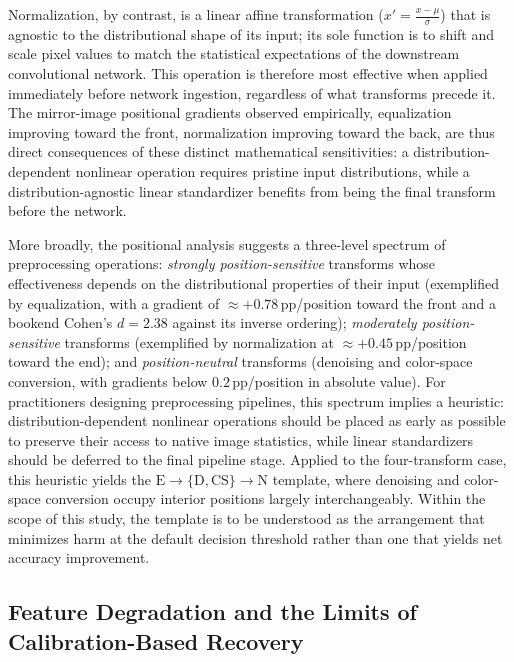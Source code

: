 \documentclass[preprint,5p,times,twocolumn]{elsarticle}
\begin{document}
Normalization, by contrast, is a linear affine transformation ($x' = \frac{x - \mu}{\sigma}$) that is agnostic to the distributional shape of its input; its sole function is to shift and scale pixel values to match the statistical expectations of the downstream convolutional network. This operation is therefore most effective when applied immediately before network ingestion, regardless of what transforms precede it. The mirror-image positional gradients observed empirically, equalization improving toward the front, normalization improving toward the back, are thus direct consequences of these distinct mathematical sensitivities: a distribution-dependent nonlinear operation requires pristine input distributions, while a distribution-agnostic linear standardizer benefits from being the final transform before the network.

More broadly, the positional analysis suggests a three-level spectrum of preprocessing operations: \emph{strongly position-sensitive} transforms whose effectiveness depends on the distributional properties of their input (exemplified by equalization, with a gradient of $\approx +0.78$\,pp/position toward the front and a bookend Cohen's $d = 2.38$ against its inverse ordering); \emph{moderately position-sensitive} transforms (exemplified by normalization at $\approx +0.45$\,pp/position toward the end); and \emph{position-neutral} transforms (denoising and color-space conversion, with gradients below $0.2$\,pp/position in absolute value). For practitioners designing preprocessing pipelines, this spectrum implies a heuristic: distribution-dependent nonlinear operations should be placed as early as possible to preserve their access to native image statistics, while linear standardizers should be deferred to the final pipeline stage. Applied to the four-transform case, this heuristic yields the $\text{E} \to \{\text{D}, \text{CS}\} \to \text{N}$ template, where denoising and color-space conversion occupy interior positions largely interchangeably. Within the scope of this study, the template is to be understood as the arrangement that minimizes harm at the default decision threshold rather than one that yields net accuracy improvement.

\subsection{Feature Degradation and the Limits of Calibration-Based Recovery}
\end{document}

